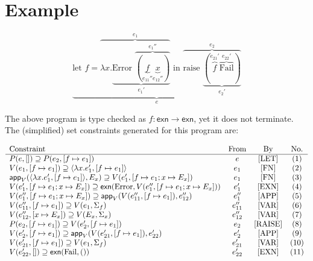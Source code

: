 \documentclass{article}
\begin{document}
\begin{center}
\begin{prooftree}
\end{prooftree}
\end{center}

\section{Example}

\[
\underbrace{\text{let }f = \overbrace{\lambda x.\underbrace{\text{Error } \overbrace{(\underbrace{f}_{e_{11}''} \underbrace{x}_{e_{12}''})}^{e_{1}''}}_{e_{1}'}}^{e_{1}}\text{ in }\overbrace{\text{raise } \underbrace{(\overbrace{f}^{e_{21}'} \overbrace{\text{Fail}}^{e_{22}'})}_{e_{2}'}}^{e_{2}}}_{e}
\]

The above program is type checked as $f:\mathsf{exn}\rightarrow \mathsf{exn}$, yet it does not terminate. The (simplified) set constraints generated for this program are:

\[
\begin{array}{l c c c}
  \text{Constraint} & \text{From} & \text{By} & \text{No.}\\
  \hline
  P(e, []) \supseteq P(e_{2},[f\mapsto e_{1}]) & e & \text{[LET]} & (1)\\
  V(e_{1},[f\mapsto e_{1}]) \supseteq \langle \lambda x.e_{1}' , [f \mapsto e_{1}]\rangle & e_{1} & \text{[FN]} & (2)\\
  \mathsf{app}_{V}(\langle \lambda x.e_{1}' , [f \mapsto e_{1}]\rangle, E_{x}) \supseteq V(e_{1}',[f \mapsto e_{1};x \mapsto E_{x}]) & e_{1} & \text{[FN]} & (3)\\
  V(e_{1}',[f \mapsto e_{1};x \mapsto E_{x}]) \supseteq \mathsf{exn}(\text{Error},V(e_{1}'', [f \mapsto e_{1};x \mapsto E_{x}])) & e_{1}' & \text{[EXN]} & (4)\\
  V(e_{1}'',[f \mapsto e_{1};x \mapsto E_{x}]) \supseteq \mathsf{app}_{V}(V(e_{11}'', [f \mapsto e_{1}]), e_{12}'') & e_{1}'' & \text{[APP]} & (5)\\
  V(e_{11}'', [f \mapsto e_{1}]) \supseteq V(e_{1},\Sigma_{f}) & e_{11}'' & \text{[VAR]} & (6)\\
  V(e_{12}'', [x \mapsto E_{x}]) \supseteq V(E_{x},\Sigma_{x}) & e_{12}'' & \text{[VAR]} & (7)\\
  P(e_{2},[f \mapsto e_{1}]) \supseteq V(e_{2}',[f \mapsto e_{1}]) & e_{2} & \text{[RAISE]} & (8)\\
  V(e_{2}', [f \mapsto e_{1}]) \supseteq \mathsf{app}_{V}(V(e_{21}', [f \mapsto e_{1}]), e_{22}') & e_{2}' & \text{[APP]} & (9)\\
  V(e_{21}', [f \mapsto e_{1}]) \supseteq V(e_{1},\Sigma_{f}) & e_{21}' & \text{[VAR]} & (10)\\
  V(e_{22}', []) \supseteq \mathsf{exn}(\text{Fail}, ()) & e_{22}' & \text{[EXN]} & (11)
\end{array}
\]
\end{document}
